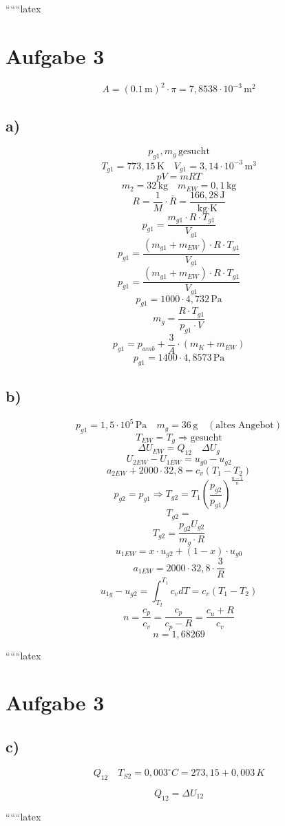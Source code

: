 
``````latex


\section*{Aufgabe 3}

\[
A = \left(0.1 \, \text{m}\right)^2 \cdot \pi = 7{,}8538 \cdot 10^{-3} \, \text{m}^2
\]

\subsection*{a)}
\[
p_{g1}, m_g \, \text{gesucht}
\]
\[
T_{g1} = 773{,}15 \, \text{K} \quad V_{g1} = 3{,}14 \cdot 10^{-3} \, \text{m}^3
\]
\[
pV = mRT
\]
\[
m_2 = 32 \, \text{kg} \quad m_{EW} = 0{,}1 \, \text{kg}
\]
\[
R = \frac{1}{M} \cdot \bar{R} = \frac{166{,}28 \, \text{J}}{\text{kg} \cdot \text{K}}
\]
\[
p_{g1} = \frac{m_{g1} \cdot R \cdot T_{g1}}{V_{g1}}
\]
\[
p_{g1} = \frac{(m_{g1} + m_{EW}) \cdot R \cdot T_{g1}}{V_{g1}}
\]
\[
p_{g1} = \frac{(m_{g1} + m_{EW}) \cdot R \cdot T_{g1}}{V_{g1}}
\]
\[
p_{g1} = 1000 \cdot 4{,}732 \, \text{Pa}
\]
\[
m_g = \frac{R \cdot T_{g1}}{p_{g1} \cdot V}
\]
\[
p_{g1} = p_{amb} + \frac{3}{A} \cdot (m_{K} + m_{EW})
\]
\[
p_{g1} = 1400 \cdot 4{,}8573 \, \text{Pa}
\]

\subsection*{b)}
\[
p_{g1} = 1{,}5 \cdot 10^5 \, \text{Pa} \quad m_g = 36 \, \text{g} \quad (\text{altes Angebot})
\]
\[
T_{EW} = T_g \Rightarrow \text{gesucht}
\]
\[
\Delta U_{EW} = Q_{12} \quad \Delta U_g
\]
\[
U_{2EW} - U_{1EW} = u_{g0} - u_{g2}
\]
\[
a_{2EW} + 2000 \cdot 32{,}8 = c_v (T_1 - T_2)
\]
\[
p_{g2} = p_{g1} \Rightarrow T_{g2} = T_1 \left( \frac{p_{g2}}{p_{g1}} \right)^{\frac{n-1}{n}}
\]
\[
T_{g2} =
\]
\[
T_{g2} = \frac{p_{g2} U_{g2}}{m_g \cdot R}
\]
\[
u_{1EW} = x \cdot u_{g2} + (1-x) \cdot u_{g0}
\]
\[
a_{1EW} = 2000 \cdot 32{,}8 \cdot \frac{3}{R}
\]
\[
u_{1g} - u_{g2} = \int_{T_2}^{T_1} c_v dT = c_v (T_1 - T_2)
\]
\[
n = \frac{c_p}{c_v} = \frac{c_p}{c_p - R} = \frac{c_u + R}{c_v}
\]
\[
n = 1{,}68269
\]

``````latex


\section*{Aufgabe 3}

\subsection*{c)}
\begin{equation*}
Q_{12} \quad T_{S2} = 0{,}003^\circ C = 273{,}15 + 0{,}003 \, K
\end{equation*}

\begin{equation*}
Q_{12} = \Delta U_{12}
\end{equation*}

``````latex


